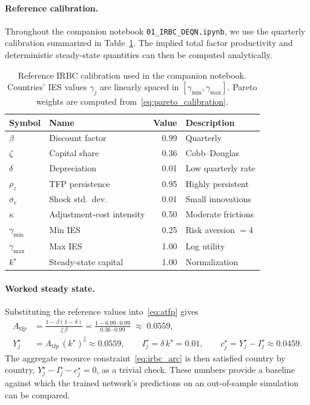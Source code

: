 \documentclass[11pt,a4paper]{report}
\begin{document}
\paragraph{Reference calibration.}  Throughout the companion notebook \texttt{01\_IRBC\_DEQN.ipynb}, we use the quarterly calibration summarized in Table~\ref{tab:irbc_params}.  The implied total factor productivity and deterministic steady-state quantities can then be computed analytically.

\begin{table}[ht]
\centering
\small
\begin{tabular}{llrl}
\toprule
\textbf{Symbol} & \textbf{Name} & \textbf{Value} & \textbf{Description} \\
\midrule
$\beta$ & Discount factor & 0.99 & Quarterly \\
$\zeta$ & Capital share & 0.36 & Cobb--Douglas \\
$\delta$ & Depreciation & 0.01 & Low quarterly rate \\
$\rho_z$ & TFP persistence & 0.95 & Highly persistent \\
$\sigma_e$ & Shock std.\ dev. & 0.01 & Small innovations \\
$\kappa$ & Adjustment-cost intensity & 0.50 & Moderate frictions \\
$\gamma_{\min}$ & Min IES & 0.25 & Risk aversion $=4$ \\
$\gamma_{\max}$ & Max IES & 1.00 & Log utility \\
$k^\star$ & Steady-state capital & 1.00 & Normalization \\
\bottomrule
\end{tabular}
\caption{Reference IRBC calibration used in the companion notebook.  Countries' IES values $\gamma_j$ are linearly spaced in $[\gamma_{\min}, \gamma_{\max}]$.  Pareto weights are computed from~\eqref{eq:pareto_calibration}.}
\label{tab:irbc_params}
\end{table}

\paragraph{Worked steady state.}  Substituting the reference values into~\eqref{eq:atfp} gives
\begin{align}
A_\mathrm{tfp} &= \frac{1-\beta(1-\delta)}{\zeta\,\beta}
               = \frac{1 - 0.99 \cdot 0.99}{0.36 \cdot 0.99}
               \;\approx\; 0.0559, \\
Y^\star_j      &= A_\mathrm{tfp}\,(k^\star)^\zeta \approx 0.0559, \qquad
I^\star_j      = \delta\,k^\star = 0.01, \qquad
c^\star_j      = Y^\star_j - I^\star_j \approx 0.0459.
\end{align}
The aggregate resource constraint~\eqref{eq:irbc_arc} is then satisfied country by country, $Y^\star_j - I^\star_j - c^\star_j = 0$, as a trivial check.  These numbers provide a baseline against which the trained network's predictions on an out-of-sample simulation can be compared.
\end{document}

